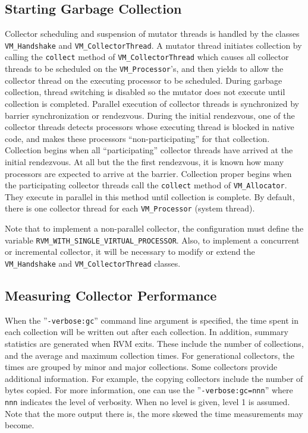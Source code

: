 \subsection{Starting Garbage Collection} \label{sssec:startgc}
Collector scheduling and suspension of mutator threads is
handled by the classes {\tt VM\_Handshake} and {\tt VM\_CollectorThread}.
A mutator thread initiates collection by calling the {\tt collect} method
of {\tt VM\_CollectorThread} which causes all collector threads to be scheduled
on the {\tt VM\_Processor}'s, and then yields to allow the collector thread
on the executing processor to be scheduled.  During garbage collection, thread
switching is disabled so the mutator does not execute until collection is completed.
Parallel execution of collector threads is synchronized by barrier synchronization or
rendezvous.  During the initial rendezvous, one of the collector threads detects
processors whose executing thread is blocked in native code, and makes
these processors ``non-participating'' for that collection.
Collection begins when all ``participating'' collector threads
have arrived at the initial rendezvous.  At all but the the first rendezvous,
it is known how many processors are expected to arrive at the barrier.
Collection proper begins when the participating collector threads
call the {\tt collect} method of {\tt VM\_Allocator}.  They execute
in parallel in this method until collection is complete.  By default,
there is one collector thread for each {\tt VM\_Processor} (system thread).

Note that to implement a non-parallel collector, 
the configuration must define the variable {\tt RVM\_WITH\_SINGLE\_VIRTUAL\_PROCESSOR}.
Also, to implement a concurrent or incremental collector,
it will be necessary to modify or extend the {\tt VM\_Handshake} and {\tt VM\_CollectorThread} classes.

\subsection{Measuring Collector Performance} \label{sssec:verbosegc}
When the ''{\tt -verbose:gc}'' command line argument is specified, the time
spent in each collection will be written out after each collection.
In addition, summary statistics are generated when RVM exits.  These include
the number of collections, and the average and maximum collection times.
For generational collectors, the times are grouped by minor and major collections.
Some collectors provide additional information.  For example,
the copying collectors include the number of bytes copied.
For more information, one can use the ''{\tt -verbose:gc=nnn}'' where {\tt nnn} indicates the level of 
verbosity.  When no level is given, level 1 is assumed.
Note that the more output there is, the more skewed the time measurements may become.

